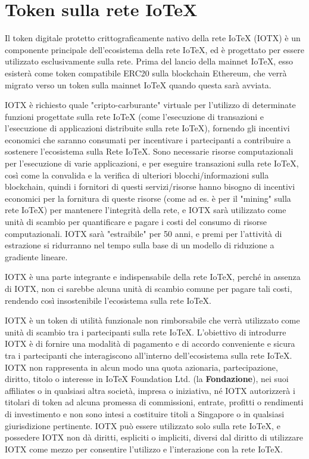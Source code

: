\section{Token sulla rete IoTeX}
Il token digitale protetto crittograficamente nativo della rete IoTeX (IOTX) è un componente principale dell'ecosistema della rete IoTeX, ed è progettato per essere utilizzato esclusivamente sulla rete. Prima del lancio della mainnet IoTeX, esso esisterà come token compatibile ERC20 sulla blockchain Ethereum, che verrà migrato verso un token sulla mainnet IoTeX quando questa sarà avviata.

IOTX è richiesto quale "cripto-carburante" virtuale per l'utilizzo di determinate funzioni progettate sulla rete IoTeX (come l'esecuzione di transazioni e l'esecuzione di applicazioni distribuite sulla rete IoTeX), fornendo gli incentivi economici che saranno consumati per incentivare i partecipanti a contribuire a sostenere l'ecosistema sulla Rete IoTeX. Sono necessarie risorse computazionali per l'esecuzione di varie applicazioni, e per eseguire transazioni sulla rete IoTeX, così come la convalida e la verifica di ulteriori blocchi/informazioni sulla blockchain, quindi i fornitori di questi servizi/risorse hanno bisogno di incentivi economici per la fornitura di queste risorse (come ad es. è per il "mining" sulla rete IoTeX) per mantenere l'integrità della rete, e IOTX sarà utilizzato come unità di scambio per quantificare e pagare i costi del consumo di risorse computazionali. IOTX sarà "estraibile" per 50 anni, e premi per l'attività di estrazione si ridurranno nel tempo sulla base di un modello di riduzione a gradiente lineare.

IOTX è una parte integrante e indispensabile della rete IoTeX, perché in assenza di IOTX, non ci sarebbe alcuna unità di scambio comune per pagare tali costi,
rendendo così insostenibile l'ecosistema sulla rete IoTeX.

IOTX è un token di utilità funzionale non rimborsabile che verrà utilizzato come unità di scambio tra i partecipanti sulla rete IoTeX. L'obiettivo di introdurre IOTX è di fornire una modalità di pagamento e di accordo conveniente e sicura tra i partecipanti che interagiscono all'interno dell'ecosistema sulla rete IoTeX. IOTX non rappresenta in alcun modo una quota azionaria, partecipazione, diritto, titolo o interesse in IoTeX Foundation Ltd. (la \textbf{Fondazione}), nei suoi affiliates o in qualsiasi altra società, impresa o iniziativa, né IOTX autorizzerà i titolari di token ad alcuna promessa di commissioni, entrate, profitti o rendimenti di investimento e non sono intesi a costituire titoli a Singapore o in qualsiasi giurisdizione pertinente. IOTX può essere utilizzato solo sulla rete IoTeX, e possedere IOTX non dà diritti, espliciti o impliciti, diversi dal diritto di utilizzare IOTX come mezzo per consentire l'utilizzo e l'interazione con la rete IoTeX.

